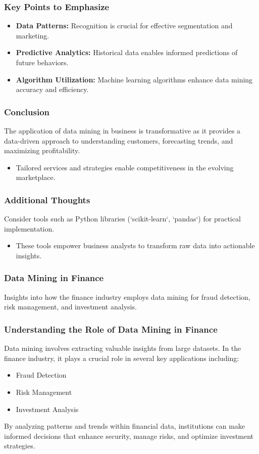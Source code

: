 \documentclass{beamer}
\begin{document}
\begin{frame}[fragile]
    \frametitle{Key Points to Emphasize}
    \begin{itemize}
        \item \textbf{Data Patterns:} Recognition is crucial for effective segmentation and marketing.
        \item \textbf{Predictive Analytics:} Historical data enables informed predictions of future behaviors.
        \item \textbf{Algorithm Utilization:} Machine learning algorithms enhance data mining accuracy and efficiency.
    \end{itemize}
\end{frame}

\begin{frame}[fragile]
    \frametitle{Conclusion}
    The application of data mining in business is transformative as it provides a data-driven approach to understanding customers, forecasting trends, and maximizing profitability. 
    \begin{itemize}
        \item Tailored services and strategies enable competitiveness in the evolving marketplace.
    \end{itemize}
\end{frame}

\begin{frame}[fragile]
    \frametitle{Additional Thoughts}
    Consider tools such as Python libraries (`scikit-learn`, `pandas`) for practical implementation.
    \begin{itemize}
        \item These tools empower business analysts to transform raw data into actionable insights.
    \end{itemize}
\end{frame}

\begin{frame}[fragile]
    \frametitle{Data Mining in Finance}
    Insights into how the finance industry employs data mining for fraud detection, risk management, and investment analysis.
\end{frame}

\begin{frame}[fragile]
    \frametitle{Understanding the Role of Data Mining in Finance}
    Data mining involves extracting valuable insights from large datasets. In the finance industry, it plays a crucial role in several key applications including:
    \begin{itemize}
        \item Fraud Detection
        \item Risk Management
        \item Investment Analysis
    \end{itemize}
    By analyzing patterns and trends within financial data, institutions can make informed decisions that enhance security, manage risks, and optimize investment strategies.
\end{frame}
\end{document}
